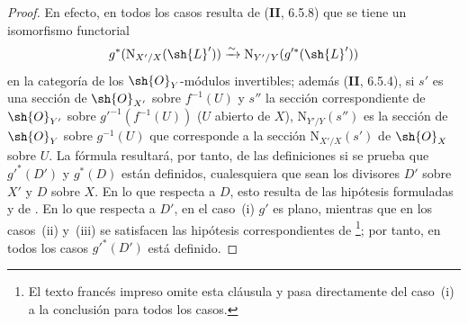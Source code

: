 \begin{proof}
En efecto, en todos los casos resulta de (\textbf{II}, 6.5.8) que se tiene un isomorfismo functorial
\[
  g^*(\mathrm{N}_{X'/X}(\sh{L}'))\xrightarrow{\sim}\mathrm{N}_{Y'/Y}(g'^*(\sh{L}'))
\]
en la categoría de los $\sh{O}_Y$-módulos invertibles;
además (\textbf{II}, 6.5.4), si $s'$ es una sección de $\sh{O}_{X'}$ sobre $f^{-1}(U)$ y $s''$ la sección correspondiente de $\sh{O}_{Y'}$ sobre $g'^{-1}(f^{-1}(U))$ ($U$ abierto de $X$), $\mathrm{N}_{Y'/Y}(s'')$ es la sección de $\sh{O}_Y$ sobre $g^{-1}(U)$ que corresponde a la sección $\mathrm{N}_{X'/X}(s')$ de $\sh{O}_X$ sobre $U$.
La fórmula  resultará, por tanto, de las definiciones si se prueba que $g'^*(D')$ y $g^*(D)$ están definidos, cualesquiera que sean los divisores $D'$ sobre $X'$ y $D$ sobre $X$.
En lo que respecta a $D$, esto resulta de las hipótesis formuladas y de .
En lo que respecta a $D'$, en el caso~(i) $g'$ es plano, mientras que en los casos~(ii) y~(iii) se satisfacen las hipótesis correspondientes de \footnote{El texto francés impreso omite esta cláusula y pasa directamente del caso~(i) a la conclusión para todos los casos.}; por tanto, en todos los casos $g'^*(D')$ está definido.
\end{proof}
